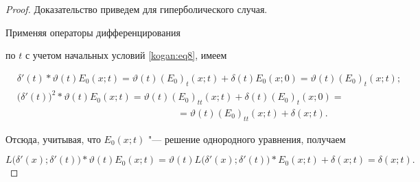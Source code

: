 \begin{proof} Доказательство приведем для гиперболического \linebreak случая. 

Применяя операторы дифференцирования 

по $t$ с учетом начальных условий \eqref{kogan:eq8}, имеем

\begin{equation}

\label{kogan:eq9} 

\begin{aligned}

&\delta'(t) \ast \vartheta (t)E_0 (x;t)=\vartheta (t)(E_0)_t (x;t)+\delta 

(t)E_0 (x;0)=\vartheta (t)(E_0)_t (x;t);\\

&\big(\delta'(t) \big)^2 \ast \vartheta (t) E_0 (x;t)  =\vartheta (t)(E_0)_{tt} 

(x;t)+\delta (t)(E_0)_t (x;0) = \\

& \hspace{7cm} =\vartheta (t)(E_0)_{tt} (x;t)+\delta (x;t).

\end{aligned}

\end{equation}

Отсюда, учитывая, что $E_0 (x;t)$ "--- решение однородного уравнения, получаем 

\begin{equation}

L\big(\delta'(x);\delta'(t) \big)\ast \vartheta (t)E_0 (x;t)=\vartheta 

(t)L\big(\delta'(x);\delta'(t) \big) \ast E_0 (x;t)+\delta (x;t)=\delta (x;t).

\end{equation} 







\hfill\end{proof}



\smallskip



